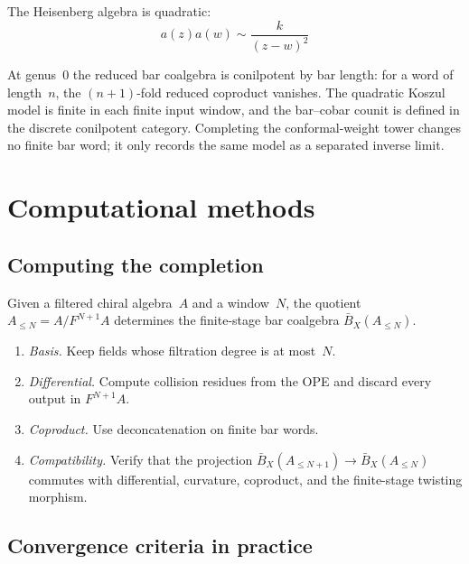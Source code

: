 \begin{example}\label{ex:heisenberg-no-completion}
The Heisenberg algebra is quadratic:
\[a(z)a(w) \sim \frac{k}{(z-w)^2}\]

At genus~$0$ the reduced bar coalgebra is conilpotent by bar length:
for a word of length~$n$, the $(n+1)$-fold reduced coproduct vanishes.
The quadratic Koszul model is finite in each finite input window, and
the bar--cobar counit is defined in the discrete conilpotent category.
Completing the conformal-weight tower changes no finite bar word; it
only records the same model as a separated inverse limit.
\end{example}

\section{Computational methods}

\subsection{Computing the completion}

\begin{remark}\label{rem:compute-completion}
Given a filtered chiral algebra~$A$ and a window~$N$, the quotient
$A_{\le N}=A/F^{N+1}A$ determines the finite-stage bar coalgebra
$\bar B_X(A_{\le N})$.
\begin{enumerate}
\item \emph{Basis.} Keep fields whose filtration degree is at most~$N$.
\item \emph{Differential.} Compute collision residues from the OPE and
 discard every output in $F^{N+1}A$.
\item \emph{Coproduct.} Use deconcatenation on finite bar words.
\item \emph{Compatibility.} Verify that the projection
 $\bar B_X(A_{\le N+1})\to\bar B_X(A_{\le N})$ commutes with
 differential, curvature, coproduct, and the finite-stage twisting
 morphism.
\end{enumerate}
\end{remark}

\subsection{Convergence criteria in practice}

